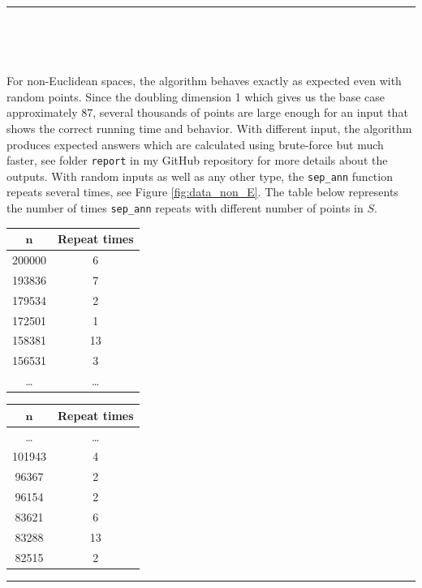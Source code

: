 \documentclass[12pt,english,]{article}
\newcommand{\code}[1]{\colorbox{light-gray}{\texttt{#1}}}
\let\origfigure\figure
\let\endorigfigure\endfigure
\renewenvironment{figure}[1][2] {
    \expandafter\origfigure\expandafter[H]
} {
    \endorigfigure
}
\begin{document}
\hrule

~

~

For non-Euclidean spaces, the algorithm behaves exactly as expected even
with random points. Since the doubling dimension 1 which gives us the
base case approximately \(87\), several thousands of points are large
enough for an input that shows the correct running time and behavior.
With different input, the algorithm produces expected answers which are
calculated using brute-force but much faster, see folder \code{report}
in my GitHub repository for more details about the outputs. With random
inputs as well as any other type, the \code{sep\_ann} function repeats
several times, see Figure \ref{fig:data_non_E}. The table below
represents the number of times \code{sep\_ann} repeats with different
number of points in \(S\).

\begin{figure}
\begin{minipage}{0.48\textwidth}
  \centering
  \begin{tabular}{|c|c|}
  \hline
  $\boldsymbol n$   & \textbf{Repeat times} \\ \hline
   200000  & 6            \\ \hline
   193836  & 7            \\ \hline
   179534  & 2            \\ \hline
   172501  & 1            \\ \hline
   158381  & 13           \\ \hline
   156531  & 3            \\ \hline
  \ldots   & \ldots       \\ \hline
  \end{tabular}
\end{minipage}
\begin{minipage}{0.48\textwidth}
  \centering
  \begin{tabular}{|c|c|}
  \hline
  $\boldsymbol n$   & \textbf{Repeat times} \\ \hline
  \ldots   & \ldots       \\ \hline
  101943   & 4            \\ \hline
   96367   & 2            \\ \hline
   96154   & 2            \\ \hline
   83621   & 6            \\ \hline
   83288   & 13           \\ \hline
   82515   & 2            \\ \hline
  \end{tabular}
\end{minipage}
\caption[Caption]{Given an input of $200\,000$ points generated in a grid. This is a portion of the data about the number of times the algorithm \textsc{SepAnn$(S,n,d,\mu,c)$} repeats.}
\label{fig:data_non_E}
\end{figure}
\hrule
\end{document}
